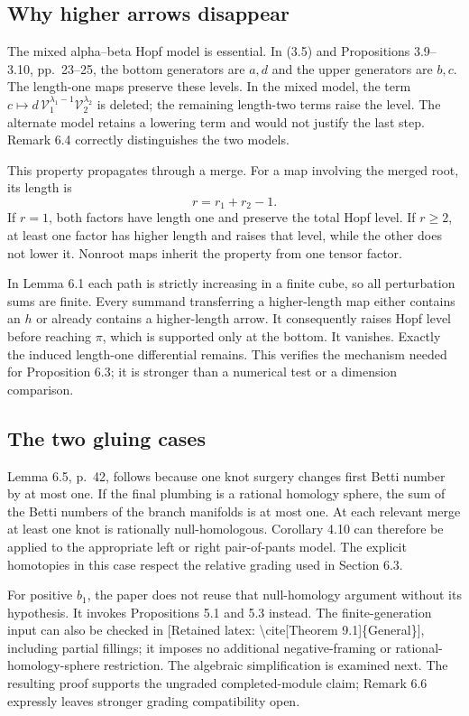 \documentclass[10pt]{article}
\begin{document}
\subsection*{Why higher arrows disappear}
The mixed alpha–beta Hopf model is essential. In (3.5) and Propositions 3.9–3.10, pp. 23–25, the bottom generators are \(a,d\) and the upper generators are \(b,c\). The length-one maps preserve these levels. In the mixed model, the term \(c\mapsto d\,\mathcal V_1^{\lambda_1-1}\mathcal V_2^{\lambda_2}\) is deleted; the remaining length-two terms raise the level. The alternate model retains a lowering term and would not justify the last step. Remark 6.4 correctly distinguishes the two models.\par
This property propagates through a merge. For a map involving the merged root, its length is \[r=r_1+r_2-1.\] If \(r=1\), both factors have length one and preserve the total Hopf level. If \(r\ge2\), at least one factor has higher length and raises that level, while the other does not lower it. Nonroot maps inherit the property from one tensor factor.\par
In Lemma 6.1 each path is strictly increasing in a finite cube, so all perturbation sums are finite. Every summand transferring a higher-length map either contains an \(h\) or already contains a higher-length arrow. It consequently raises Hopf level before reaching \(\pi\), which is supported only at the bottom. It vanishes. Exactly the induced length-one differential remains. This verifies the mechanism needed for Proposition 6.3; it is stronger than a numerical test or a dimension comparison.\par
\subsection*{The two gluing cases}
Lemma 6.5, p. 42, follows because one knot surgery changes first Betti number by at most one. If the final plumbing is a rational homology sphere, the sum of the Betti numbers of the branch manifolds is at most one. At each relevant merge at least one knot is rationally null-homologous. Corollary 4.10 can therefore be applied to the appropriate left or right pair-of-pants model. The explicit homotopies in this case respect the relative grading used in Section 6.3.\par
For positive \(b_1\), the paper does not reuse that null-homology argument without its hypothesis. It invokes Propositions 5.1 and 5.3 instead. The finite-generation input can also be checked in [Retained latex: \textbackslash{}cite[Theorem 9.1]\{General\}], including partial fillings; it imposes no additional negative-framing or rational-homology-sphere restriction. The algebraic simplification is examined next. The resulting proof supports the ungraded completed-module claim; Remark 6.6 expressly leaves stronger grading compatibility open.\par
\end{document}
